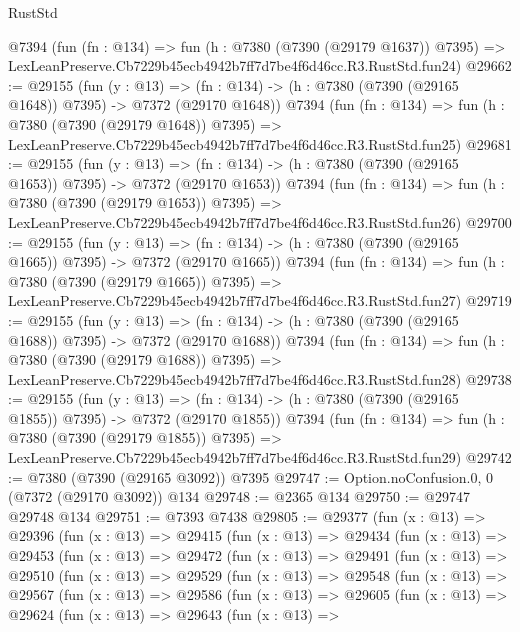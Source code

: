\begin{lexlean}{RustStd}
\begin{coremodule}
    @7394
    (fun (fn : @134) =>
    fun (h : @7380 (@7390 (@29179 @1637)) @7395) =>
    LexLeanPreserve.Cb7229b45ecb4942b7ff7d7be4f6d46cc.R3.RustStd.fun24)
@29662 := @29155
    (fun (y : @13) =>
    (fn : @134) -> (h : @7380 (@7390 (@29165 @1648)) @7395) -> @7372 (@29170 @1648))
    @7394
    (fun (fn : @134) =>
    fun (h : @7380 (@7390 (@29179 @1648)) @7395) =>
    LexLeanPreserve.Cb7229b45ecb4942b7ff7d7be4f6d46cc.R3.RustStd.fun25)
@29681 := @29155
    (fun (y : @13) =>
    (fn : @134) -> (h : @7380 (@7390 (@29165 @1653)) @7395) -> @7372 (@29170 @1653))
    @7394
    (fun (fn : @134) =>
    fun (h : @7380 (@7390 (@29179 @1653)) @7395) =>
    LexLeanPreserve.Cb7229b45ecb4942b7ff7d7be4f6d46cc.R3.RustStd.fun26)
@29700 := @29155
    (fun (y : @13) =>
    (fn : @134) -> (h : @7380 (@7390 (@29165 @1665)) @7395) -> @7372 (@29170 @1665))
    @7394
    (fun (fn : @134) =>
    fun (h : @7380 (@7390 (@29179 @1665)) @7395) =>
    LexLeanPreserve.Cb7229b45ecb4942b7ff7d7be4f6d46cc.R3.RustStd.fun27)
@29719 := @29155
    (fun (y : @13) =>
    (fn : @134) -> (h : @7380 (@7390 (@29165 @1688)) @7395) -> @7372 (@29170 @1688))
    @7394
    (fun (fn : @134) =>
    fun (h : @7380 (@7390 (@29179 @1688)) @7395) =>
    LexLeanPreserve.Cb7229b45ecb4942b7ff7d7be4f6d46cc.R3.RustStd.fun28)
@29738 := @29155
    (fun (y : @13) =>
    (fn : @134) -> (h : @7380 (@7390 (@29165 @1855)) @7395) -> @7372 (@29170 @1855))
    @7394
    (fun (fn : @134) =>
    fun (h : @7380 (@7390 (@29179 @1855)) @7395) =>
    LexLeanPreserve.Cb7229b45ecb4942b7ff7d7be4f6d46cc.R3.RustStd.fun29)
@29742 := @7380 (@7390 (@29165 @3092)) @7395
@29747 := Option.noConfusion.{0, 0} (@7372 (@29170 @3092)) @134
@29748 := @2365 @134
@29750 := @29747 @29748 @134
@29751 := @7393 @7438
@29805 := @29377
    (fun (x : @13) =>
    @29396
      (fun (x : @13) =>
      @29415
        (fun (x : @13) =>
        @29434
          (fun (x : @13) =>
          @29453
            (fun (x : @13) =>
            @29472
              (fun (x : @13) =>
              @29491
                (fun (x : @13) =>
                @29510
                  (fun (x : @13) =>
                  @29529
                    (fun (x : @13) =>
                    @29548
                      (fun (x : @13) =>
                      @29567
                        (fun (x : @13) =>
                        @29586
                          (fun (x : @13) =>
                          @29605
                            (fun (x : @13) =>
                            @29624
                              (fun (x : @13) =>
                              @29643
                                (fun (x : @13) =>

\end{coremodule}
\end{lexlean}
